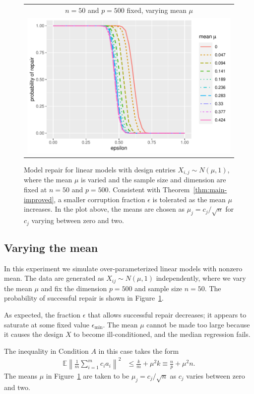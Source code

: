 \begin{figure}[ht]
  \begin{center}
    \begin{tabular}{c}
      $n=50$ and $p=500$ fixed, varying mean $\mu$\\
      \includegraphics[width=.55\textwidth]{figures/fig5}
    \end{tabular}
  \end{center}
\caption{Model repair for linear models with design entries $X_{i,j}\sim N(\mu, 1)$,
where the mean $\mu$ is varied and the sample size and dimension are fixed at $n=50$ and $p=500$. Consistent with Theorem~\ref{thm:main-improved}, a smaller corruption fraction $\epsilon$ is tolerated as the mean $\mu$ increases. In the plot above, the means are chosen as $\mu_j = c_j/\sqrt{n}$ for $c_j$ varying between zero and two.}
\label{fig:mean}
\end{figure}

\subsection{Varying the mean}


In this experiment we simulate over-parameterized linear models
with nonzero mean. The data are generated as $X_{ij} \sim N(\mu,1)$
independently, where we vary the mean $\mu$ and fix the dimension $p=500$ and sample size $n=50$.
The probability of successful repair is shown in Figure~\ref{fig:mean}.


As expected, the fraction $\epsilon$ that allows successful repair decreases; it appears to saturate at some fixed value $\epsilon_{\min}$. The mean $\mu$ cannot be made too large because it causes the design $X$ to become ill-conditioned, and the median regression fails.

The inequality in Condition $A$  in this case takes the form
\begin{align*}
  \mathbb{E}\left\|\frac{1}{m}\sum_{i=1}^m c_i a_i\right\|^2 &\leq \frac{k}{m} + \mu^2 k
   \equiv \frac{n}{p} + \mu^2 n.
\end{align*}
The means $\mu$ in Figure~\ref{fig:mean} are taken to be $\mu_j = c_j / \sqrt{n}$ as $c_j$ varies between zero and two.

